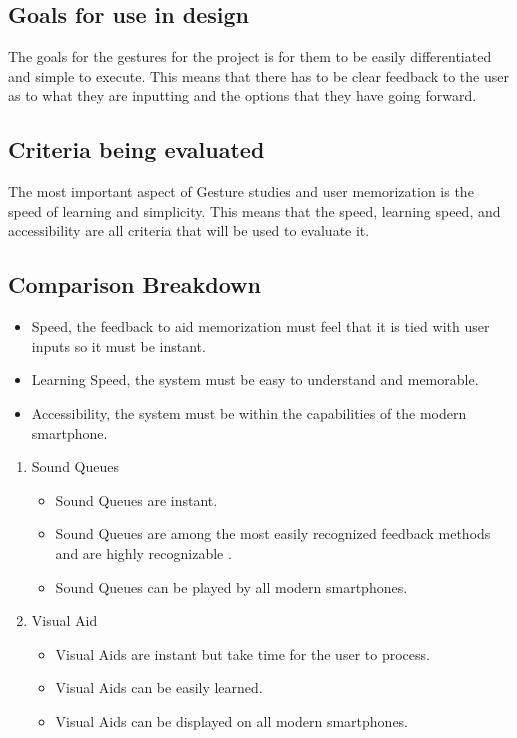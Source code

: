 \documentclass[onecolumn, draftclsnofoot,10pt, journal, letterpaper]{IEEEtran}
\begin{document}
    \subsection{Goals for use in design}
        The goals for the gestures for the project is for them to be easily differentiated and simple to execute. This means that there has to be clear feedback to the user as to what they are inputting and the options that they have going forward.
        
    \subsection{Criteria being evaluated }
        The most important aspect of Gesture studies and user memorization is the speed of learning and simplicity. This means that the speed, learning speed, and accessibility are all criteria that will be used to evaluate it.
        
    \subsection{Comparison Breakdown}
        \begin{itemize}
            \item Speed, the feedback to aid memorization must feel that it is tied with user inputs so it must be instant.
            \item Learning Speed, the system must be easy to understand and memorable.
            \item Accessibility, the system must be within the capabilities of the modern smartphone.
        \end{itemize}
        
        \begin{enumerate}
            \item Sound Queues

            \begin{itemize}
                \item Sound Queues are instant.
                \item Sound Queues are among the most easily recognized feedback methods and are highly recognizable \cite{Brian}.
                \item Sound Queues can be played by all modern smartphones.
            \end{itemize}
            \item Visual Aid
            \begin{itemize}
                \item Visual Aids are instant but take time for the user to process.
                \item Visual Aids can be easily learned.
                \item Visual Aids can be displayed on all modern smartphones.
            \end{itemize}
        \end{enumerate}
        
\end{document}
